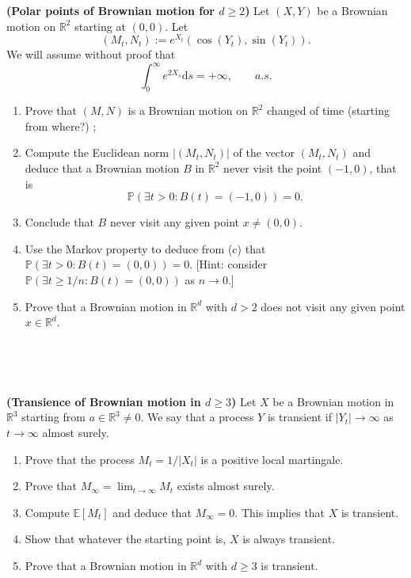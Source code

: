 \documentclass{article}
\newcommand{\assign}{:=}
\newcommand{\mathd}{\mathrm{d}}
\newcommand{\tmtextbf}[1]{{\bfseries{#1}}}
\newenvironment{enumeratealpha}{\begin{enumerate}[a{\textup{)}}] }{\end{enumerate}}
{\theorembodyfont{\rmfamily\small}\newtheorem{exercise}{Exercise}}
\begin{document}
\begin{exercise}
  [Pts 2+2+2+1+1] \tmtextbf{(Polar points of Brownian motion for $d \geqslant
  2$)} Let $(X, Y)$ be a Brownian motion on $\mathbb{R}^2$ starting at $(0,
  0)$. Let
  \[ (M_t, N_t) \assign e^{X_t} (\cos (Y_t), \sin (Y_t)) . \]
  We will assume without proof that
  \[ \int_0^{\infty} e^{2 X_s} \mathd s = + \infty, \qquad a.s. \]
  \begin{enumeratealpha}
    \item Prove that $(M, N)$ is a Brownian motion on $\mathbb{R}^2$ changed
    of time (starting from where?) ;
    
    \item Compute the Euclidean norm $| (M_t, N_t) |$ of the vector $(M_t,
    N_t)$ and deduce that a Brownian motion $B$ in $\mathbb{R}^2$ never visit
    the point $(- 1, 0)$, that is
    \[ \mathbb{P} (\exists t > 0 : B (t) = (- 1, 0)) = 0. \]
    \item Conclude that $B$ never visit any given point $x \neq (0, 0)$.
    
    \item Use the Markov property to deduce from (c) that $\mathbb{P} (\exists
    t > 0 : B (t) = (0, 0)) = 0.$ [Hint: consider $\mathbb{P} (\exists t
    \geqslant 1 / n : B (t) = (0, 0))$ as $n \rightarrow 0$.]
    
    \item Prove that a Brownian motion in $\mathbb{R}^d$ with $d > 2$ does not
    visit any given point $x \in \mathbb{R}^d$.
  \end{enumeratealpha}
\end{exercise}

\

\hrulefill

\

\begin{exercise}
  [Pts 2+2+2+1+1] \tmtextbf{(Transience of Brownian motion in $d \geqslant
  3$)} Let $X$ be a Brownian motion in $\mathbb{R}^3$ starting from $a \in
  \mathbb{R}^3 \neq 0$. We say that a process $Y$ is transient if $| Y_t |
  \rightarrow \infty$ as $t \rightarrow \infty$ almost surely.
  \begin{enumeratealpha}
    \item Prove that the process $M_t = 1 / | X_t |$ is a positive local
    martingale.
    
    \item Prove that $M_{\infty} = \lim_{t \rightarrow \infty} M_t$ exists
    almost surely.
    
    \item Compute $\mathbb{E} [M_t]$ and deduce that $M_{\infty} = 0$. This
    implies that $X$ is transient.
    
    \item Show that whatever the starting point is, $X$ is always transient.
    
    \item Prove that a Brownian motion in $\mathbb{R}^d$ with $d \geqslant 3$
    is transient.
  \end{enumeratealpha}
\end{exercise}
\end{document}

